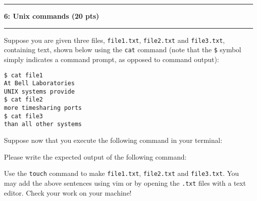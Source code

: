 \documentclass[11pt]{article}
\newcommand\question[2]{\vspace{.25in}\hrule\textbf{#1: #2}\vspace{.5em}\hrule\vspace{.10in}}
\begin{document}
\newpage
\question{6}{Unix commands (20 pts)}
Suppose you are given three files, \texttt{file1.txt}, \texttt{file2.txt} and
\texttt{file3.txt}, containing text, shown below using the \texttt{cat} command
(note that the \texttt{\$} symbol simply indicates a command prompt, as opposed
to command output):
\begin{multicols}{3}
    { \footnotesize 
    \texttt{\$ cat file1} \\
    \texttt{At Bell Laboratories} \\
    \texttt{UNIX systems provide} \\
    }
    \columnbreak
    { \footnotesize 
    \texttt{\$ cat file2} \\
    \texttt{more timesharing ports} \\
    }
    \columnbreak
    { \footnotesize 
    \texttt{\$ cat file3} \\
    \texttt{than all other systems} \\
    }
\end{multicols}
Suppose now that you execute the following command in your terminal:
\begin{figure}[H]
    \center
\end{figure}
Please write the expected output of the following command:
\begin{figure}[H]
    \center
\end{figure}
\vspace{0.5cm}
\vspace{0.5cm}
\vspace{0.5cm}
Use the \texttt{touch} command to make \texttt{file1.txt}, \texttt{file2.txt} and
\texttt{file3.txt}. You may add the above sentences using vim or by opening the \texttt{.txt} files with a text editor. Check your work on your machine!


\newpage
\renewcommand\page{2}
\renewcommand\rightHead{\lastName \\ \Page}
\setlength{\headheight}{13pt}

\setlength{\headheight}{13pt}
\newpage
\renewcommand\page{3}

\setlength{\headheight}{13pt}
\newpage
\renewcommand\page{4}
\end{document}
